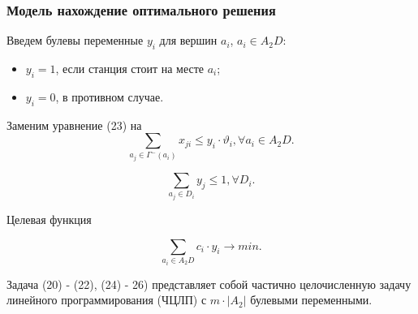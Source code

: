 \begin{frame}
    \frametitle{Модель нахождение оптимального решения }
    \fontsize{8pt}{7.2}\selectfont
    

    \begin{minipage}[c]{0.5\linewidth}
        Введем булевы переменные $y_i$ для вершин $a_i$, $a_i \in A_2D$:
    \begin{itemize}
        \item $y_i = 1$, если станция стоит на месте $a_i$;
        \item $y_i = 0$, в противном случае.
    \end{itemize}
        Заменим уравнение (23) на 
        \begin{equation}\label{eq:part2_1.8_2}
            \sum_{a_j \in \Gamma^-(a_i)} x_{ji} \leqslant y_i \cdot \vartheta_i, \forall a_i \in A_2D.
        \end{equation} 

        \begin{equation}\label{eq:part2_1.9}
            \sum_{a_j \in D_i} y_j \leqslant 1, \forall D_i.
        \end{equation}

        Целевая функция

        \begin{equation}\label{eq:part2_1.10}
            \sum_{a_i \in A_2D} c_i \cdot y_i \to min.
        \end{equation}
        \bigskip
        \bigskip

    \end{minipage}
    \hfill
    \begin{minipage}[c]{0.47\linewidth}
        \flushright
    \end{minipage}

    Задача (20) - (22), (24) - 26) представляет собой частично целочисленную задачу линейного программирования (ЧЦЛП) с $m \cdot |A_2|$ булевыми переменными.
    
\end{frame}

